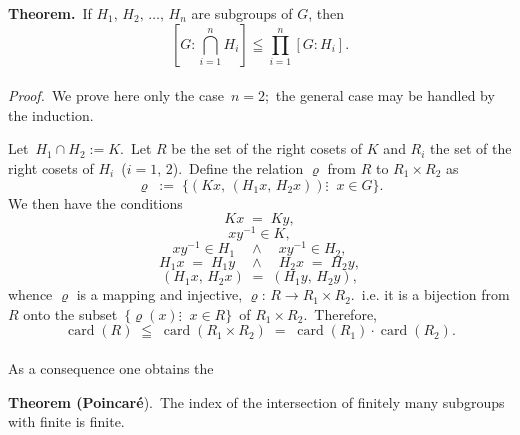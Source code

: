 \documentclass[12pt]{article}
\DeclareMathOperator{\card}{card}
\theoremstyle{definition}
\begin{document}
\textbf{Theorem.}\, If $H_1,\,H_2,\,\ldots,\,H_n$ are subgroups of $G$, then
$$\left[G:\bigcap_{i=1}^nH_i\right] \leqq \prod_{i=1}^n[G:H_i].$$\\

\emph{Proof.}\, We prove here only the case \,$n = 2$;\, the general case may be handled by the induction.

Let\, $H_1\!\cap\!H_2 := K$.\, Let $R$ be the set of the right cosets of $K$ and $R_i$ the set of the right cosets of 
$H_i$\, ($i = 1,\,2$).\, Define the relation $\varrho$ from $R$ to $R_1\!\times\!R_2$ as
$$\varrho \;:=\; \{\left(Kx,\,(H_1x,\,H_2x)\right)\vdots\;\; x \in G \}.$$
We then have the  conditions
$$Kx \;=\; Ky,$$
$$xy^{-1} \in K,$$
$$xy^{-1} \in H_1 \quad\land\quad xy^{-1} \in H_2,$$
$$H_1x \;=\; H_1y \quad\land\quad H_2x \;=\; H_2y,$$
$$(H_1x,\,H_2x) \;=\; (H_1y,\,H_2y),$$
whence $\varrho$ is a mapping and  injective,\; $\varrho:\, R \to R_1\!\times\!R_2$.\, i.e. it is a bijection from $R$ onto the subset \,$\{\varrho(x)\vdots\;\; x \in R\}$\, of $R_1\!\times\!R_2$.\, Therefore,
$$\card(R) \;\leqq\; \card(R_1\!\times\!R_2) \;=\; \card(R_1)\cdot\card(R_2).$$\\


As a consequence one obtains the

\textbf{Theorem (Poincar\'e}).\, The index of the intersection of finitely many subgroups with finite  is finite.


\end{document}
